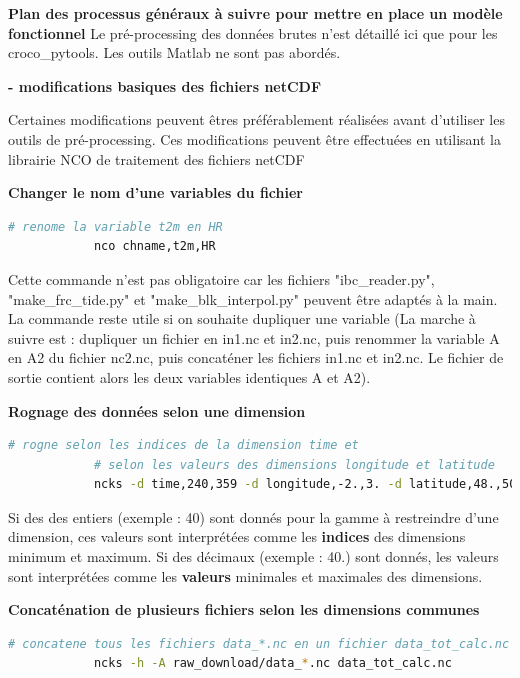 \documentclass[10pt,a4paper,titlepage]{article}
\begin{document}
\begin{processEnv}{\textbf{Plan des processus généraux à suivre pour mettre en place un modèle fonctionnel}}
    Le pré-processing des données brutes n'est détaillé ici que pour les croco\_pytools. Les outils Matlab ne sont pas abordés.

    \textbf{- modifications basiques des fichiers netCDF}

    Certaines modifications peuvent êtres préférablement réalisées avant d'utiliser les outils de pré-processing. Ces modifications peuvent être effectuées en utilisant la librairie NCO de traitement des fichiers netCDF

    \begin{codeEnv}{\textbf{Changer le nom d'une variables du fichier}}
        \begin{lstlisting}[language=bash]
            # renome la variable t2m en HR
            nco chname,t2m,HR
        \end{lstlisting}
    \end{codeEnv}

    Cette commande n'est pas obligatoire car les fichiers "ibc\_reader.py", "make\_frc\_tide.py" et "make\_blk\_interpol.py" peuvent être adaptés à la main.
    La commande reste utile si on souhaite dupliquer une variable (La marche à suivre est : dupliquer un fichier en in1.nc et in2.nc, puis renommer la variable A en A2 du fichier nc2.nc, puis concaténer les fichiers in1.nc et in2.nc. Le fichier de sortie contient alors les deux variables identiques A et A2).

    \begin{codeEnv}{\textbf{Rognage des données selon une dimension}}
        \begin{lstlisting}[language=bash]
            # rogne selon les indices de la dimension time et
            # selon les valeurs des dimensions longitude et latitude
            ncks -d time,240,359 -d longitude,-2.,3. -d latitude,48.,50. in.nc out.nc
        \end{lstlisting}
    \end{codeEnv}

    Si des des entiers (exemple : 40) sont donnés pour la gamme à restreindre d'une dimension, ces valeurs sont interprétées comme les \textbf{indices} des dimensions minimum et maximum. Si des décimaux (exemple : 40.) sont donnés, les valeurs sont interprétées comme les \textbf{valeurs }minimales et maximales des dimensions.

    \begin{codeEnv}{\textbf{Concaténation de plusieurs fichiers selon les dimensions communes}}
        \begin{lstlisting}[language=bash]
            # concatene tous les fichiers data_*.nc en un fichier data_tot_calc.nc
            ncks -h -A raw_download/data_*.nc data_tot_calc.nc
        \end{lstlisting}
    \end{codeEnv}


\end{processEnv}
\end{document}
